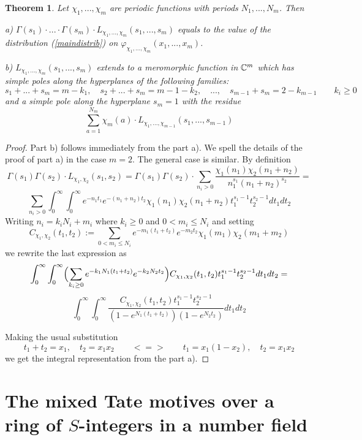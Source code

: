 \documentclass[10pt]{article}
\newtheorem{theorem}{Theorem}[section]
\begin{document}
\begin{theorem} \label{anconti}Let $\chi_1,..., \chi_m$ are  
periodic functions with periods $N_1,..., N_m$. Then

a) $
\Gamma(s_1)\cdot ... \cdot\Gamma(s_m)\cdot L_{ \chi_1,..., \chi_m}(s_1,...,s_m)
$ 
equals to the value of the distribution (\ref{maindistrib})
on $\varphi_{\chi_1,...,\chi_m}(x_1,...,x_m)$.

b) $L_{\chi_1,..., \chi_m}(s_1,...,s_m)$ extends to a meromorphic 
function in   ${\mathbb C}^m$ which    has  simple poles along the hyperplanes 
of the following families: 
$$
s_1 + ... +s_m = m-k_1, \quad s_2 + ... +s_m= m-1-k_2, \quad ..., \quad s_{m-1} +   s_m = 
2-k_{m-1}\qquad  k_i \geq 0
$$
  and   a simple pole along the hyperplane $s_m =1$  with the residue 
$$ 
\sum_{a=1}^{N_m}\chi_m(a)\cdot  L_{\chi_1,..., \chi_{m-1}}(s_1,...,s_{m-1})
$$  
\end{theorem} 
 
\begin{proof} Part b) follows immediately from the part a). We  spell the details of the proof of part a) in the case $m=2$. The general case is   similar. By definition
$$
\Gamma(s_1)\Gamma(s_2)\cdot L_{ \chi_1, \chi_2}(s_1,s_2) = \Gamma(s_1)\Gamma(s_2)\cdot \sum_{n_i >0}\frac{\chi_1(n_1)\chi_2(n_1 + n_2)}{n_1  ^{s_1}(n_1 + n_2)^{s_2}} = 
$$
$$
\sum_{n_i >0}\int_0^{\infty}\int_0^{\infty} e^{-n_1 t_1} e^{-(n_1 + n_2) t_2}
\chi_1(n_1)\chi_2(n_1 + n_2)  t_1^{s_1-1} t_2^{s_2-1} d t_1d t_2
$$ 
Writing $n_i = k_iN_i + m_i$ where $k_i \geq 0$ and $0< m_i \leq N_i$ 
and setting 
$$
C_{\chi_1,\chi_2}( t_1,  t_2) := \sum_{0< m_i \leq  N_i } e^{-m_1( t_1 + t_2)}e^{-m_2  t_2 } \chi_1( m_1) \chi_2( m_1 +  m_2)
$$
we  rewrite the last expression as
$$
\int_0^{\infty}\int_0^{\infty} \Bigl(\sum_{k_i \geq 0}e^{-k_1N_1( t_1 + t_2)}  e^{-k_2N_2  t_2 }\Bigr)C_{\chi_1,\chi_2}( t_1,t_2) t_1^{s_1-1} t_2^{s_2-1} d t_1d t_2
=
$$
$$
\int_0^{\infty}\int_0^{\infty}  \frac{C_{\chi_1,\chi_2}( t_1,  t_2)  t_1^{s_1-1} t
_2^{s_2-1}}{(1 - e^{N_1( t_1+ t_2)}  )(1 - e^{N_2  t_2 } )}d t_1d t_2
$$

Making the usual substitution 
$$
t_1 + t_2 = x_1, \quad t_2 = x_1x_2  \qquad <=> \qquad t_1 = x_1(1-x_2), \quad  t_2 = x_1 x_2
$$
we get the integral representation from the part a).


\end{proof}

\section{ The mixed Tate motives over a ring of 
\texorpdfstring{$S$}{S}-integers in a number field}
\end{document}
